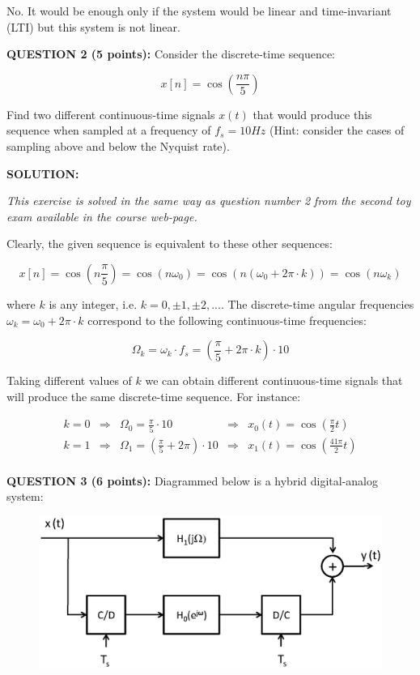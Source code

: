 \documentclass[a4paper,11pt,oneside]{article}
\begin{document}
No. It would be enough only if the system would be linear and time-invariant (LTI) but this system is not linear. 


\vspace{1cm}

\textbf{QUESTION 2 (5 points):} Consider the discrete-time sequence:

\[
x[n] = \cos\left(\frac{n\pi}{5}\right)
\]

Find two different continuous-time signals $x(t)$ that would produce this sequence when sampled at a frequency of $f_s=10Hz$ (Hint: consider the cases of sampling above and below the Nyquist rate). 


\vspace{1cm}

\textbf{SOLUTION:}

\emph{This exercise is solved in the same way as question number 2 from the second toy exam available in the course web-page.}

Clearly, the given sequence is equivalent to these other sequences:

\[
x[n] = \cos\left(n\frac{\pi}{5}\right)= \cos\left(n\omega_0\right)=\cos\left(n(\omega_0+2\pi \cdot k)\right)=\cos(n\omega_k)
\]

where $k$ is any integer, i.e. $k=0, \pm 1, \pm 2,...$. The discrete-time angular frequencies $\omega_k=\omega_0+2\pi \cdot k$ correspond to the following continuous-time frequencies:

\[
\Omega_k = \omega_k \cdot f_s = \left(\frac{\pi}{5}+2\pi \cdot k\right)\cdot 10
\]

Taking different values of $k$ we can obtain different continuous-time signals that will produce the same discrete-time sequence. For instance:

\[
\begin{array}{lllll}
k = 0 &\Rightarrow& \Omega_0 = \frac{\pi}{5}\cdot 10 &\Rightarrow& x_0(t)=\cos(\frac{\pi}{2}t)\\
k = 1 &\Rightarrow& \Omega_1 = (\frac{\pi}{5}+2\pi)\cdot 10 &\Rightarrow& x_1(t)=\cos(\frac{41\pi}{2}t)\\
\end{array}
\]


\vspace{1cm}

\textbf{QUESTION 3 (6 points):} Diagrammed below is a hybrid digital-analog system:

\begin{figure}[h!]
\centering
\includegraphics[width=.8\textwidth]{fig1.eps}
\label{fig1}
\end{figure} 
\end{document}
